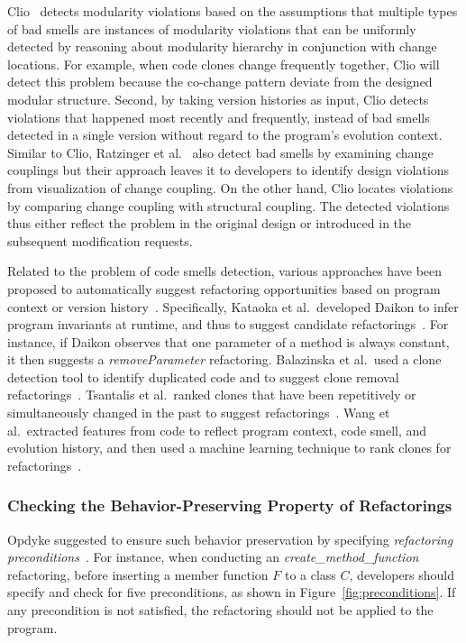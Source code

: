 \documentclass[runningheads,a4paper]{llncs}
\begin{document}
Clio~\cite{Wong2011:cleo} detects modularity violations based on the assumptions that multiple types of bad smells are instances of modularity violations that can be uniformly detected by reasoning about modularity hierarchy in conjunction with change locations.  For example, when code clones change frequently together, Clio will detect this problem because the co-change pattern deviate from the designed modular structure. Second, by taking version histories as input, Clio detects violations that happened most recently and frequently, instead of bad smells detected in a single version without regard to the program's evolution context. Similar to Clio, Ratzinger et al.~\cite{ratzinger:msr05} also detect bad smells by examining change couplings but their approach leaves it to developers to identify design violations from visualization of change coupling. On the other hand, Clio locates violations by comparing change coupling with structural coupling. The detected violations thus either reflect the problem in the original design or introduced in the subsequent modification requests.

Related to the problem of code smells detection, various approaches have been proposed to automatically suggest refactoring opportunities based on program context or version history~\cite{Balazinska2000:ACA,Kataoka2001:ASP,Higo2008:metricrefactoring,Tsantalis2011:rankRefactoring,Wang2014:recommendClones,Meng2015:ARO}. Specifically, Kataoka et al.~developed Daikon to infer program invariants at runtime, and thus to suggest candidate refactorings~\cite{Kataoka2001:ASP}. For instance, if Daikon observes that one parameter of a method is always constant, it then suggests a \emph{removeParameter} refactoring. Balazinska et al.~used a clone detection tool to identify duplicated code and to suggest clone removal refactorings~\cite{Balazinska2000:ACA}. Tsantalis et al.~ranked clones that have been repetitively or simultaneously changed in the past to suggest refactorings~\cite{Tsantalis2011:rankRefactoring}. Wang et al.~extracted features from code to reflect program context, code smell, and evolution history, and then used a machine learning technique to rank clones for refactorings~\cite{Wang2014:recommendClones}.


\subsubsection{Checking the Behavior-Preserving Property of Refactorings}Opdyke suggested to ensure such behavior preservation by specifying \emph{refactoring preconditions}~\cite{Opdyke1992:ROF}. For instance, when conducting an \emph{create\_method\_function} refactoring, before inserting a member function $F$ to a class $C$, developers should specify and check for five preconditions, as shown in Figure~\ref{fig:preconditions}. If any precondition is not satisfied, the refactoring should not be applied to the program.
\end{document}
